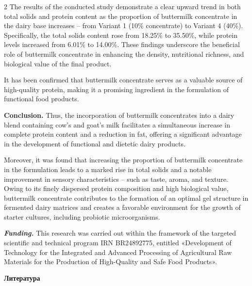 \begin{multicols}{2}
The results of the conducted study demonstrate a clear upward trend in
both total solids and protein content as the proportion of buttermilk
concentrate in the dairy base increases -- from Variant 1 (10\%
concentrate) to Variant 4 (40\%). Specifically, the total solids content
rose from 18.25\% to 35.50\%, while protein levels increased from 6.01\%
to 14.00\%. These findings underscore the beneficial role of buttermilk
concentrate in enhancing the density, nutritional richness, and
biological value of the final product.

It has been confirmed that buttermilk concentrate serves as a valuable
source of high-quality protein, making it a promising ingredient in the
formulation of functional food products.

{\bfseries Conclusion.} Thus, the incorporation of buttermilk concentrates
into a dairy blend containing cow's and goat's milk facilitates a
simultaneous increase in complete protein content and a reduction in
fat, offering a significant advantage in the development of functional
and dietetic dairy products.

Moreover, it was found that increasing the proportion of buttermilk
concentrate in the formulation leads to a marked rise in total solids
and a notable improvement in sensory characteristics -- such as taste,
aroma, and texture. Owing to its finely dispersed protein composition
and high biological value, buttermilk concentrate contributes to the
formation of an optimal gel structure in fermented dairy matrices and
creates a favorable environment for the growth of starter cultures,
including probiotic microorganisms.

\emph{{\bfseries Funding.}} This research was carried out within the
framework of the targeted scientific and technical program IRN
BR24892775, entitled «Development of Technology for the Integrated and
Advanced Processing of Agricultural Raw Materials for the Production of
High-Quality and Safe Food Products».
\end{multicols}

\begin{center}
{\bfseries Литература}
\end{center}

